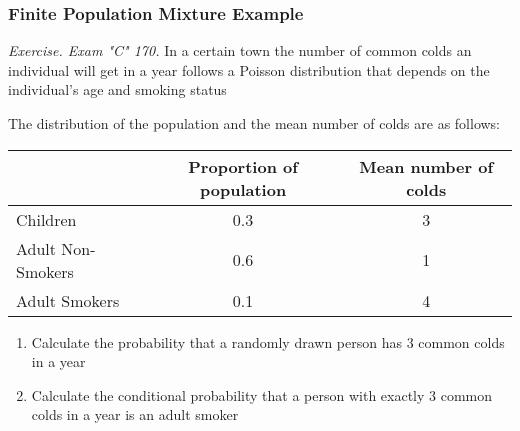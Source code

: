 \documentclass{beamer}
\begin{document}
\begin{frame}[shrink=2]%
\frametitle{Finite Population Mixture Example}

\textit{Exercise. Exam "C" 170.} In a certain town the number of
common colds an individual will get in a year follows a Poisson
distribution that depends on the individual's age and smoking
status\vspace{2mm}

The distribution of the population and the mean number of colds are
as follows: \vspace{2mm} 
\begin{center}
\begin{tabular}{l|cc}
\hline           & Proportion of population & Mean number of colds \\ \hline
  Children &        0.3 &          3 \\
Adult Non-Smokers &        0.6 &          1 \\
Adult Smokers &        0.1 &          4 \\\hline
\end{tabular}\end{center}
 \vspace{2mm}
  \begin{enumerate}
  \item Calculate the probability that a randomly drawn person has 3 common colds in a
  year \vspace{2mm}
  \item Calculate the conditional probability that a person with exactly 3 common colds in a year is an adult
  smoker
  \end{enumerate}
\end{frame}
\end{document}
